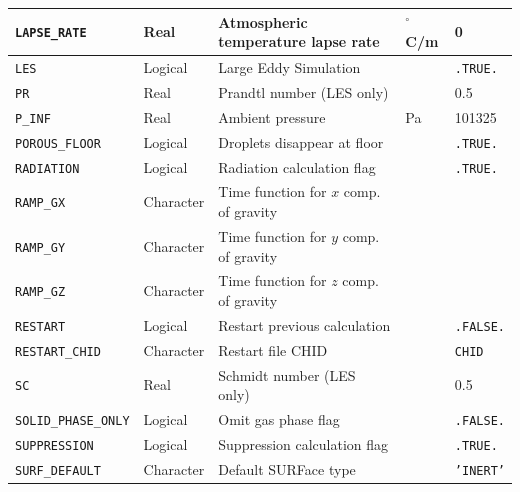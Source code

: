 \documentclass[11pt]{book}
\newcommand{\ct}{\tt\small}
\begin{document}
\begin{table}[H]
\begin{tabular*}{\textwidth}{@{\extracolsep{\fill}}|l|l|l|l|l|}
{\ct LAPSE\_RATE}           & Real          & Atmospheric temperature lapse rate            &  $^\circ$C/m  & 0                 \\ \hline
{\ct LES}                   & Logical       & Large Eddy Simulation                         &               & {\ct .TRUE.}      \\ \hline
{\ct PR}                    & Real          & Prandtl number (LES only)                     &               & 0.5               \\ \hline
{\ct P\_INF}                & Real          & Ambient pressure                              & Pa            & 101325            \\ \hline
{\ct POROUS\_FLOOR}         & Logical       & Droplets disappear at floor                   &               & {\ct .TRUE.}      \\ \hline
{\ct RADIATION}             & Logical       & Radiation calculation flag                    &               & {\ct .TRUE.}      \\ \hline
{\ct RAMP\_GX}              & Character     & Time function for $x$ comp. of gravity        &               &                   \\ \hline
{\ct RAMP\_GY}              & Character     & Time function for $y$ comp. of gravity        &               &                   \\ \hline
{\ct RAMP\_GZ}              & Character     & Time function for $z$ comp. of gravity        &               &                   \\ \hline
{\ct RESTART}               & Logical       & Restart previous calculation                  &               & {\ct .FALSE.}     \\ \hline
{\ct RESTART\_CHID}         & Character     & Restart file CHID                             &               & {\ct CHID}        \\ \hline
{\ct SC}                    & Real          & Schmidt number (LES only)                     &               & 0.5               \\ \hline
{\ct SOLID\_PHASE\_ONLY}    & Logical       & Omit gas phase flag                           &               & {\ct .FALSE.}     \\ \hline
{\ct SUPPRESSION}           & Logical       & Suppression calculation flag                  &               & {\ct .TRUE.}      \\ \hline
{\ct SURF\_DEFAULT}         & Character     & Default SURFace type                          &               & {\ct 'INERT'}     \\ \hline

\end{tabular*}
\end{table}
\end{document}
